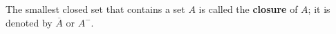 The smallest closed set that contains a set $A$ is called the \textbf{closure} of $A$; it is denoted by $\overline{A}$ or $A^{-}$.
